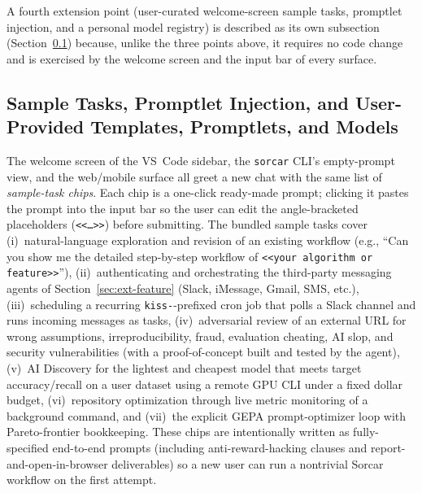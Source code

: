 \documentclass{article}
\begin{document}
A fourth extension point (user-curated welcome-screen sample tasks, promptlet injection, and a personal model registry) is described as its own subsection (Section~\ref{sec:customization-feature}) because, unlike the three points above, it requires no code change and is exercised by the welcome screen and the input bar of every surface.

\subsection{Sample Tasks, Promptlet Injection, and User-Provided Templates, Promptlets, and Models}
\label{sec:customization-feature}

The welcome screen of the VS~Code sidebar, the \texttt{sorcar} CLI's empty-prompt view, and the web/mobile surface all greet a new chat with the same list of \emph{sample-task chips}.  Each chip is a one-click ready-made prompt; clicking it pastes the prompt into the input bar so the user can edit the angle-bracketed placeholders (\texttt{<<\ldots>>}) before submitting.  The bundled sample tasks cover (i)~natural-language exploration and revision of an existing workflow (e.g., ``Can you show me the detailed step-by-step workflow of \texttt{<<your algorithm or feature>>}''), (ii)~authenticating and orchestrating the third-party messaging agents of Section~\ref{sec:ext-feature} (Slack, iMessage, Gmail, SMS, etc.), (iii)~scheduling a recurring \texttt{kiss-}-prefixed cron job that polls a Slack channel and runs incoming messages as tasks, (iv)~adversarial review of an external URL for wrong assumptions, irreproducibility, fraud, evaluation cheating, AI slop, and security vulnerabilities (with a proof-of-concept built and tested by the agent), (v)~AI Discovery for the lightest and cheapest model that meets target accuracy/recall on a user dataset using a remote GPU CLI under a fixed dollar budget, (vi)~repository optimization through live metric monitoring of a background command, and (vii)~the explicit GEPA prompt-optimizer loop with Pareto-frontier bookkeeping.  These chips are intentionally written as fully-specified end-to-end prompts (including anti-reward-hacking clauses and report-and-open-in-browser deliverables) so a new user can run a nontrivial Sorcar workflow on the first attempt.
\end{document}

